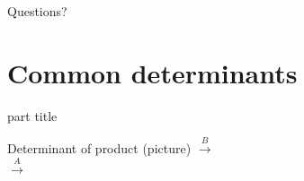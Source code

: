 \documentclass{beamer}
\begin{document}
\begin{frame}
  Questions?
\end{frame}

\section{Common determinants}

\begin{frame}
  \begin{beamercolorbox}[sep=12pt,center]{part title}
    \insertsection\par
  \end{beamercolorbox}
\end{frame}

\begin{frame}{Determinant of product (picture)}
  \hspace{3.1cm}$\xrightarrow{B}$
  \\
  \hspace{-1cm}$\xrightarrow{A}$

\end{frame}
\end{document}
